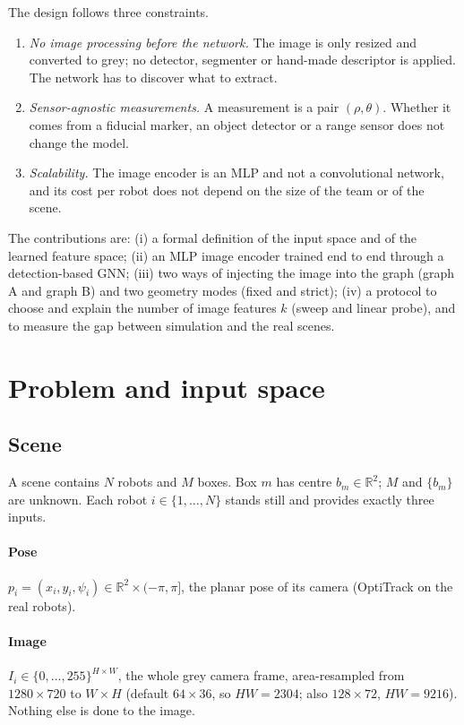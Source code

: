 \documentclass[conference]{IEEEtran}
\newcommand{\R}{\mathbb{R}}
\begin{document}
The design follows three constraints.
\begin{enumerate}
\item \emph{No image processing before the network.} The image is only resized and converted to grey; no detector,
segmenter or hand-made descriptor is applied. The network has to discover what to extract.
\item \emph{Sensor-agnostic measurements.} A measurement is a pair $(\rho,\theta)$. Whether it comes from a fiducial
marker, an object detector or a range sensor does not change the model.
\item \emph{Scalability.} The image encoder is an MLP and not a convolutional network, and its cost per robot does not
depend on the size of the team or of the scene.
\end{enumerate}

The contributions are: (i) a formal definition of the input space and of the learned feature space;
(ii) an MLP image encoder trained end to end through a detection-based GNN; (iii) two ways of injecting the image
into the graph (graph A and graph B) and two geometry modes (fixed and strict); (iv) a protocol to choose and explain
the number of image features $k$ (sweep and linear probe), and to measure the gap between simulation and the real
scenes.

\section{Problem and input space}

\subsection{Scene}
A scene contains $N$ robots and $M$ boxes. Box $m$ has centre $b_m\in\R^2$; $M$ and $\{b_m\}$ are unknown. Each robot
$i\in\{1,\dots,N\}$ stands still and provides exactly three inputs.

\paragraph{Pose} $p_i=(x_i,y_i,\psi_i)\in\R^2\times(-\pi,\pi]$, the planar pose of its camera (OptiTrack on the real
robots).

\paragraph{Image} $I_i\in\{0,\dots,255\}^{H\times W}$, the whole grey camera frame, area-resampled from
$1280\times720$ to $W\times H$ (default $64\times36$, so $HW=2304$; also $128\times72$, $HW=9216$). Nothing else is
done to the image.
\end{document}
